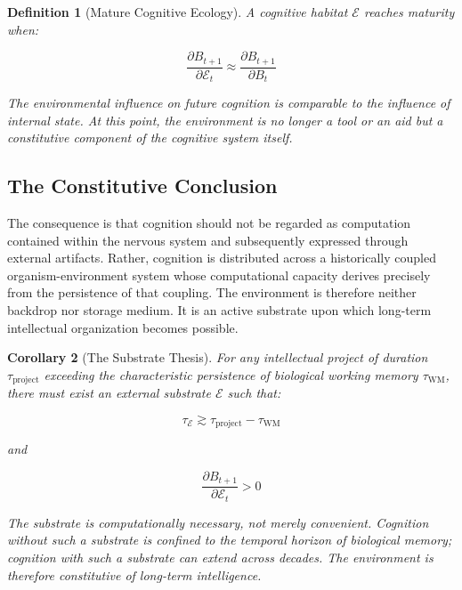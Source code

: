 \documentclass[12pt,oneside]{article}
\newtheorem{definition}{Definition}[section]
\newtheorem{corollary}[definition]{Corollary}
\theoremstyle{remark}
\begin{document}
\begin{definition}[Mature Cognitive Ecology]
A cognitive habitat \(\mathcal{E}\) reaches maturity when:

\[
\frac{\partial B_{t+1}}{\partial \mathcal{E}_t} \approx \frac{\partial B_{t+1}}{\partial B_t}
\]

The environmental influence on future cognition is comparable to the influence of internal state. At this point, the environment is no longer a tool or an aid but a constitutive component of the cognitive system itself.
\end{definition}

\subsection{The Constitutive Conclusion}

The consequence is that cognition should not be regarded as computation contained within the nervous system and subsequently expressed through external artifacts. Rather, cognition is distributed across a historically coupled organism-environment system whose computational capacity derives precisely from the persistence of that coupling. The environment is therefore neither backdrop nor storage medium. It is an active substrate upon which long-term intellectual organization becomes possible.

\begin{corollary}[The Substrate Thesis]
For any intellectual project of duration \(\tau_{\text{project}}\) exceeding the characteristic persistence of biological working memory \(\tau_{\text{WM}}\), there must exist an external substrate \(\mathcal{E}\) such that:

\[
\tau_{\mathcal{E}} \gtrsim \tau_{\text{project}} - \tau_{\text{WM}}
\]

and

\[
\frac{\partial B_{t+1}}{\partial \mathcal{E}_t} > 0
\]

The substrate is computationally necessary, not merely convenient. Cognition without such a substrate is confined to the temporal horizon of biological memory; cognition with such a substrate can extend across decades. The environment is therefore constitutive of long-term intelligence.
\end{corollary}

\end{document}
